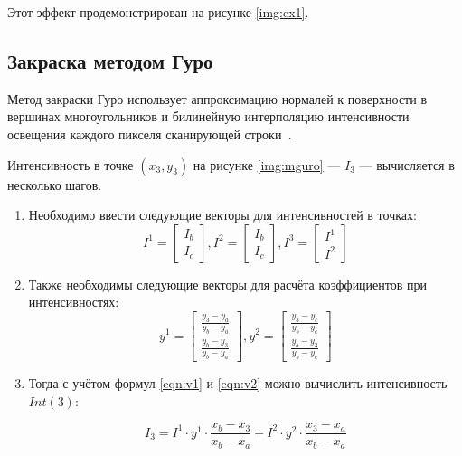 Этот эффект продемонстрирован на рисунке \ref{img:ex1}.

 \pagebreak

\subsection{Закраска методом Гуро}

Метод закраски Гуро использует аппроксимацию нормалей к поверхности в вершинах многоугольников и билинейную интерполяцию интенсивности освещения каждого пикселя сканирующей строки~\cite{light}. 

Интенсивность в точке $(x_3, y_3)$ на рисунке \ref{img:mguro} --- $I_3$ --- вычисляется в несколько шагов.

\pagebreak
 
 \begin{enumerate}
 	\item Необходимо ввести следующие векторы для интенсивностей в точках:
 	\begin{equation}
 		\label{eqn:v1} 
 		I^1 = 
 		\begin{bmatrix}
 			I_b \\
 			I_c
 		\end{bmatrix},
 		I^2 = \begin{bmatrix}
 			I_b \\
 			I_c
 		\end{bmatrix},
 		I^3 = \begin{bmatrix}
 			I^1\\
 			I^2
 		\end{bmatrix}
 	\end{equation}
 	\item Также необходимы следующие векторы для расчёта коэффициентов при интенсивностях:
 	\begin{equation}
 		\label{eqn:v2}
 		y^1 = \begin{bmatrix}
 			\frac{y_3-y_a}{y_b-y_a}\\
 			\frac{y_b-y_3}{y_b-y_a}
 		\end{bmatrix},
 		y^2 = \begin{bmatrix}
 			\frac{y_3-y_c}{y_b-y_c}\\
 			\frac{y_b-y_3}{y_b-y_c}
 		\end{bmatrix}
 	\end{equation}
 	\item Тогда с учётом формул \ref{eqn:v1} и \ref{eqn:v2} можно вычислить интенсивность $Int(3)$:
 	
 	\begin{equation}
 		I_3 = I^1\cdot y^1 \cdot \frac{x_b-x_3}{x_b-x_a} + I^2\cdot y^2 \cdot \frac{x_3-x_a}{x_b-x_a}
 	\end{equation}
 \end{enumerate}

